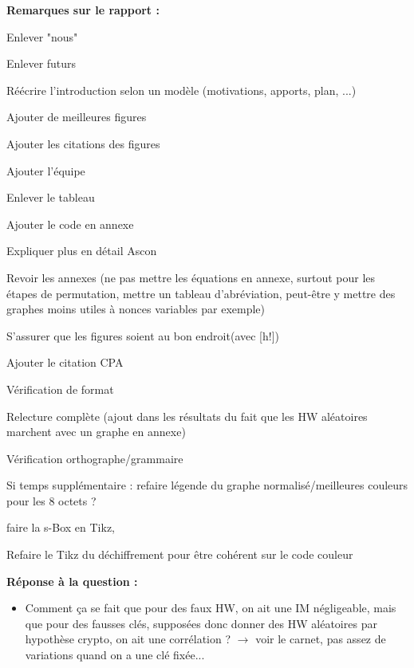 \documentclass[12pt]{article}
\newcommand{\cmark}{\ding{51}}%
\newcommand{\done}{\rlap{$\square$}{\raisebox{2pt}{\large\hspace{1pt}\cmark}}%
	\hspace{-2.5pt}}
\begin{document}
	\noindent \textbf{Remarques sur le rapport :} 
	\begin{todolist}
		\item[\done] Enlever "nous"
		\item[\done] Enlever futurs
		\item[\done] Réécrire l'introduction selon un modèle (motivations, apports, plan, ...)
		\item[\done] Ajouter de meilleures figures
		\item[\done] Ajouter les citations des figures
		\item[\done] Ajouter l'équipe
		\item[\done] Enlever le tableau
		\item[\done] Ajouter le code en annexe
		\item[\done] Expliquer plus en détail Ascon
		\item[\done] Revoir les annexes (ne pas mettre les équations en annexe, surtout pour les étapes de permutation, mettre un tableau d'abréviation, peut-être y mettre des graphes moins utiles à nonces variables par exemple)
		\item[\done] S'assurer que les figures soient au bon endroit(avec [h!])
		\item[\done] Ajouter le citation CPA
		\item[\done] Vérification de format
		\item[\done] Relecture complète (ajout dans les résultats du fait que les HW aléatoires marchent avec un graphe en annexe)
		\item[\done] Vérification orthographe/grammaire
		\item[\done] Si temps supplémentaire : refaire légende du graphe normalisé/meilleures couleurs pour les 8 octets ?
		\item[\done] faire la s-Box en Tikz, 
		\item[\done] Refaire le Tikz du déchiffrement pour être cohérent sur le code couleur
	\end{todolist}
	
	\noindent \textbf{Réponse à la question :}
	\begin{itemize}
		\item Comment ça se fait que pour des faux HW, on ait une IM négligeable, mais que pour des fausses clés, supposées donc donner des HW aléatoires par hypothèse crypto, on ait une corrélation ? $\rightarrow$ voir le carnet, pas assez de variations quand on a une clé fixée...
	\end{itemize}
	
\end{document}
